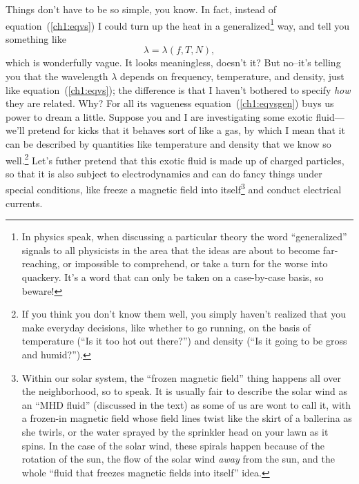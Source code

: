 Things don't have to be so simple, you know. In fact, instead of
equation~(\ref{ch1:eqvs}) I could turn up the heat in a
generalized\footnote{In physics speak, when discussing a particular
  theory the word ``generalized'' signals to all physicists in the
  area that the ideas are about to become far-reaching, or impossible
  to comprehend, or take a turn for the worse into quackery. It's a
  word that can only be taken on a case-by-case basis, so beware!}
way, and tell you something like
\begin{equation}
  \label{ch1:eqvsgen}
  \lambda = \lambda (f,T,N),
\end{equation}
which is wonderfully vague. It looks meaningless, doesn't it? But
no--it's telling you that the wavelength $\lambda$ depends on
frequency, temperature, and density, just like
equation~(\ref{ch1:eqvs}); the difference is that I haven't bothered
to specify \emph{how} they are related. Why? For all its vagueness
equation~(\ref{ch1:eqvsgen}) buys us power to dream a little. Suppose
you and I are investigating some exotic fluid---we'll pretend for
kicks that it behaves sort of like a gas, by which I mean that it can
be described by quantities like temperature and density that we know
so well.\footnote{If you think you don't know them well, you simply
  haven't realized that you make everyday decisions, like whether to
  go running, on the basis of temperature (``Is it too hot out
  there?'') and density (``Is it going to be gross and humid?'').}
Let's futher pretend that this exotic fluid is made up of charged
particles, so that it is also subject to electrodynamics and can do
fancy things under special conditions, like freeze a magnetic field
into itself\footnote{Within our solar system, the ``frozen magnetic
  field'' thing happens all over the neighborhood, so to speak. It is
  usually fair to describe the solar wind as an ``MHD fluid''
  (discussed in the text) as some of us are wont to call it, with a
  frozen-in magnetic field whose field lines twist like the skirt of a
  ballerina as she twirls, or the water sprayed by the sprinkler head
  on your lawn as it spins. In the case of the solar wind, these
  spirals happen because of the rotation of the sun, the flow of the
  solar wind \emph{away} from the sun, and the whole ``fluid that
  freezes magnetic fields into itself'' idea.} and conduct electrical
currents.

